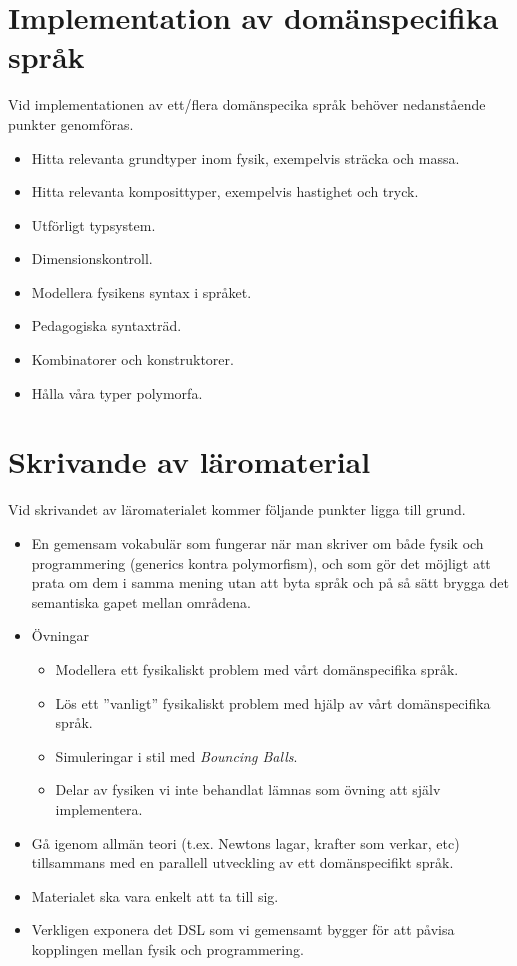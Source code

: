 \section*{Implementation av domänspecifika språk}

Vid implementationen av ett/flera domänspecika språk behöver nedanstående punkter genomföras.

\begin{itemize}
    \item Hitta relevanta grundtyper inom fysik, exempelvis sträcka och massa.
    \item Hitta relevanta komposittyper, exempelvis hastighet och tryck.
    \item Utförligt typsystem.
    \item Dimensionskontroll.
    \item Modellera fysikens syntax i språket.
    \item Pedagogiska syntaxträd.
    \item Kombinatorer och konstruktorer.
    \item Hålla våra typer polymorfa.
\end{itemize}

\section*{Skrivande av läromaterial}

Vid skrivandet av läromaterialet kommer följande punkter ligga till grund.

\begin{itemize}
    \item En gemensam vokabulär som fungerar när man skriver om både
      fysik och programmering (generics kontra polymorfism), och som gör det
      möjligt att prata om dem i samma mening utan att byta språk och på så sätt
      brygga det semantiska gapet mellan områdena.  
    \item Övningar
        \begin{itemize}
            \item Modellera ett fysikaliskt problem med vårt domänspecifika språk.
            \item Lös ett ''vanligt'' fysikaliskt problem med hjälp av vårt domänspecifika språk.
            \item Simuleringar i stil med \textit{Bouncing Balls}.
            \item Delar av fysiken vi inte behandlat lämnas som övning att själv implementera.
        \end{itemize}
    \item Gå igenom allmän teori (t.ex. Newtons lagar, krafter som verkar, etc) tillsammans med en parallell utveckling av ett domänspecifikt språk.
    \item Materialet ska vara enkelt att ta till sig.
    \item Verkligen exponera det DSL som vi gemensamt bygger för att påvisa kopplingen mellan fysik och programmering.
\end{itemize}
